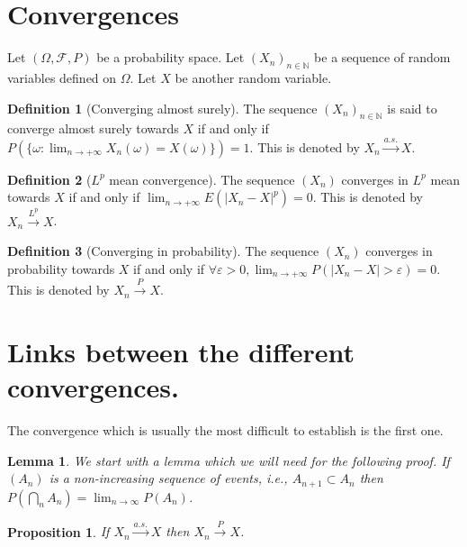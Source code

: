 \documentclass[10pt,a4paper]{book}
\newtheorem{lemma}[theorem]{Lemma}
\newtheorem{proposition}{Proposition}[section]
\theoremstyle{definition}
\newtheorem{definition}{Definition}[section]
\begin{document}
\section{Convergences}
Let $(\Omega, \mathcal{F}, P)$ be a probability space. Let $(X_n)_{n \in \mathbb{N}}$ be a sequence of random variables defined on $\Omega$. Let $X$ be another random variable.

\begin{definition}[Converging almost surely]
The sequence $(X_n)_{n \in \mathbb{N}}$ is said to converge almost surely towards $X$ if and only if $P(\{\omega : \lim_{n\to+\infty} X_n(\omega) = X(\omega)\}) = 1$. This is denoted by $X_n \stackrel{a.s.}{\longrightarrow} X$. 
\end{definition}

\begin{definition}[$L^p$ mean convergence]
The sequence $(X_n)$ converges in $L^p$ mean towards $X$ if and only if $\lim_{n \to +\infty} E(|X_n - X|^p) = 0$. This is denoted by $X_n \stackrel{L^p}{\longrightarrow} X$. 
\end{definition}

\begin{definition}[Converging in probability]
The sequence $(X_n)$ converges in probability towards $X$ if and only if $\forall \varepsilon > 0, \lim_{n \to +\infty} P(|X_n - X| > \varepsilon) = 0$. This is denoted by $X_n \stackrel{P}{\longrightarrow} X$. 
\end{definition}

\section{Links between the different convergences.}
The convergence which is usually the most difficult to establish is the first one. 

\begin{lemma}
We start with a lemma which we will need for the following proof. If $(A_n)$ is a non-increasing sequence of events, i.e., $A_{n+1}\subset A_n$ then $P(\bigcap_n A_n) = \lim_{n \to \infty} P(A_n)$. 
\end{lemma}

\begin{proposition}
If $X_n \stackrel{a.s.}{\longrightarrow} X$ then $X_n \stackrel{P}{\longrightarrow} X$. 
\end{proposition}
\end{document}
